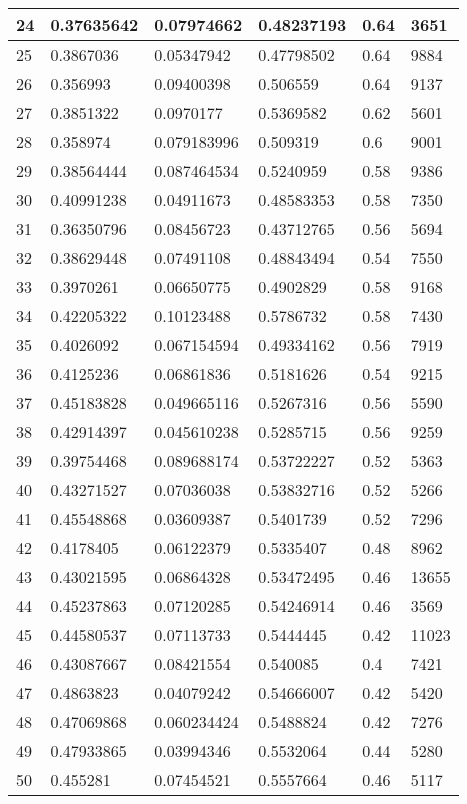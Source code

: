 \begin{longtable}{|l|l|l|l|l|l|}
24 & 0.37635642 & 0.07974662 & 0.48237193 & 0.64 & 3651 \\ \hline 
25 & 0.3867036 & 0.05347942 & 0.47798502 & 0.64 & 9884 \\ \hline 
26 & 0.356993 & 0.09400398 & 0.506559 & 0.64 & 9137 \\ \hline 
27 & 0.3851322 & 0.0970177 & 0.5369582 & 0.62 & 5601 \\ \hline 
28 & 0.358974 & 0.079183996 & 0.509319 & 0.6 & 9001 \\ \hline 
29 & 0.38564444 & 0.087464534 & 0.5240959 & 0.58 & 9386 \\ \hline 
30 & 0.40991238 & 0.04911673 & 0.48583353 & 0.58 & 7350 \\ \hline 
31 & 0.36350796 & 0.08456723 & 0.43712765 & 0.56 & 5694 \\ \hline 
32 & 0.38629448 & 0.07491108 & 0.48843494 & 0.54 & 7550 \\ \hline 
33 & 0.3970261 & 0.06650775 & 0.4902829 & 0.58 & 9168 \\ \hline 
34 & 0.42205322 & 0.10123488 & 0.5786732 & 0.58 & 7430 \\ \hline 
35 & 0.4026092 & 0.067154594 & 0.49334162 & 0.56 & 7919 \\ \hline 
36 & 0.4125236 & 0.06861836 & 0.5181626 & 0.54 & 9215 \\ \hline 
37 & 0.45183828 & 0.049665116 & 0.5267316 & 0.56 & 5590 \\ \hline 
38 & 0.42914397 & 0.045610238 & 0.5285715 & 0.56 & 9259 \\ \hline 
39 & 0.39754468 & 0.089688174 & 0.53722227 & 0.52 & 5363 \\ \hline 
40 & 0.43271527 & 0.07036038 & 0.53832716 & 0.52 & 5266 \\ \hline 
41 & 0.45548868 & 0.03609387 & 0.5401739 & 0.52 & 7296 \\ \hline 
42 & 0.4178405 & 0.06122379 & 0.5335407 & 0.48 & 8962 \\ \hline 
43 & 0.43021595 & 0.06864328 & 0.53472495 & 0.46 & 13655 \\ \hline 
44 & 0.45237863 & 0.07120285 & 0.54246914 & 0.46 & 3569 \\ \hline 
45 & 0.44580537 & 0.07113733 & 0.5444445 & 0.42 & 11023 \\ \hline 
46 & 0.43087667 & 0.08421554 & 0.540085 & 0.4 & 7421 \\ \hline 
47 & 0.4863823 & 0.04079242 & 0.54666007 & 0.42 & 5420 \\ \hline 
48 & 0.47069868 & 0.060234424 & 0.5488824 & 0.42 & 7276 \\ \hline 
49 & 0.47933865 & 0.03994346 & 0.5532064 & 0.44 & 5280 \\ \hline 
50 & 0.455281 & 0.07454521 & 0.5557664 & 0.46 & 5117 \\ \hline 
\end{longtable}